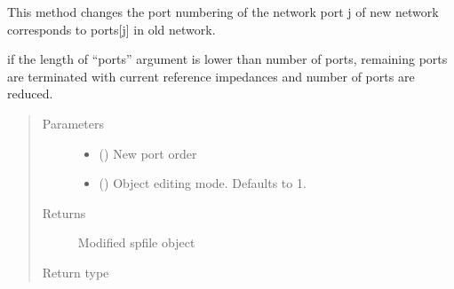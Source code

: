 \documentclass[letterpaper,10pt,english]{sphinxmanual}
\begin{document}
\begin{fulllineitems}
\begin{fulllineitems}
\label{\detokenize{touchstone:touchstone.spfile.snp2smp}}
This method changes the port numbering of the network
port j of new network corresponds to ports{[}j{]} in old network.

if the length of “ports” argument is lower than number of ports, remaining ports are terminated with current reference impedances and number of ports are reduced.
\begin{quote}\begin{description}
\item[{Parameters}] \leavevmode\begin{itemize}
\item {} 
 () \textendash{} New port order

\item {} 
 (\sphinxstyleliteralemphasis{\sphinxupquote{, }}) \textendash{} Object editing mode. Defaults to \sphinxhyphen{}1.

\end{itemize}

\item[{Returns}] \leavevmode
Modified spfile object

\item[{Return type}] \leavevmode
{\hyperref[\detokenize{touchstone:touchstone.spfile}]{}}

\end{description}\end{quote}

\end{fulllineitems}



\end{fulllineitems}
\end{document}
